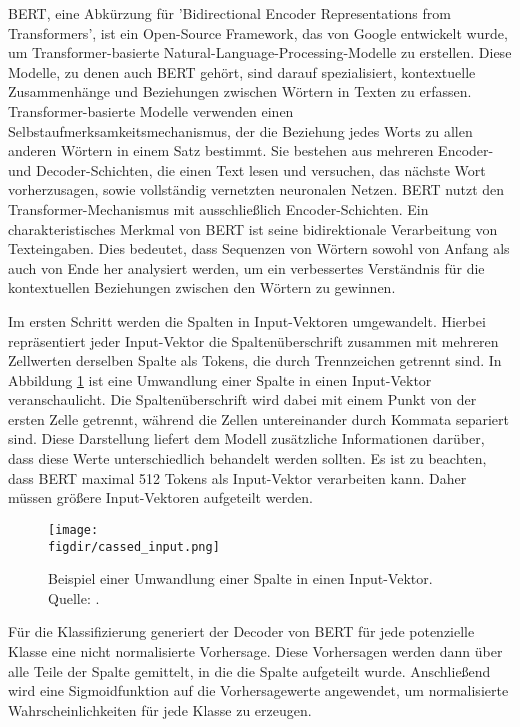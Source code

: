 BERT, eine Abkürzung für 'Bidirectional Encoder Representations from Transformers', ist ein Open-Source Framework, das von Google entwickelt wurde, um Transformer-basierte Natural-Language-Processing-Modelle zu erstellen. Diese Modelle, zu denen auch BERT gehört, sind darauf spezialisiert, kontextuelle Zusammenhänge und Beziehungen zwischen Wörtern in Texten zu erfassen. Transformer-basierte Modelle verwenden einen Selbstaufmerksamkeitsmechanismus, der die Beziehung jedes Worts zu allen anderen Wörtern in einem Satz bestimmt. Sie bestehen aus mehreren Encoder- und Decoder-Schichten, die einen Text lesen und versuchen, das nächste Wort vorherzusagen, sowie vollständig vernetzten neuronalen Netzen. BERT nutzt den Transformer-Mechanismus mit ausschließlich Encoder-Schichten. Ein charakteristisches Merkmal von BERT ist seine bidirektionale Verarbeitung von Texteingaben. Dies bedeutet, dass Sequenzen von Wörtern sowohl von Anfang als auch von Ende her analysiert werden, um ein verbessertes Verständnis für die kontextuellen Beziehungen zwischen den Wörtern zu gewinnen.

Im ersten Schritt werden die Spalten in Input-Vektoren umgewandelt. Hierbei repräsentiert jeder Input-Vektor die Spaltenüberschrift zusammen mit mehreren Zellwerten derselben Spalte als Tokens, die durch Trennzeichen getrennt sind. In Abbildung \ref{f:input} ist eine Umwandlung einer Spalte in einen Input-Vektor veranschaulicht.  Die Spaltenüberschrift wird dabei mit einem Punkt von der ersten Zelle getrennt, während die Zellen untereinander durch Kommata separiert sind. Diese Darstellung liefert dem Modell zusätzliche Informationen darüber, dass diese Werte unterschiedlich behandelt werden sollten. Es ist zu beachten, dass BERT maximal 512 Tokens als Input-Vektor verarbeiten kann. Daher müssen größere Input-Vektoren aufgeteilt werden.

\begin{figure}[htbp]
    \centering
    \texttt{[image: \\figdir/cassed\_input.png]}
    \caption{Beispiel einer Umwandlung einer Spalte in einen Input-Vektor. Quelle: \cite{Kuzina.2023}.}
    \label{f:input}
\end{figure}

Für die Klassifizierung generiert der Decoder von BERT für jede potenzielle Klasse eine nicht normalisierte Vorhersage. Diese Vorhersagen werden dann über alle Teile der Spalte gemittelt, in die die Spalte aufgeteilt wurde. Anschließend wird eine Sigmoidfunktion auf die Vorhersagewerte angewendet, um normalisierte Wahrscheinlichkeiten für jede Klasse zu erzeugen.

